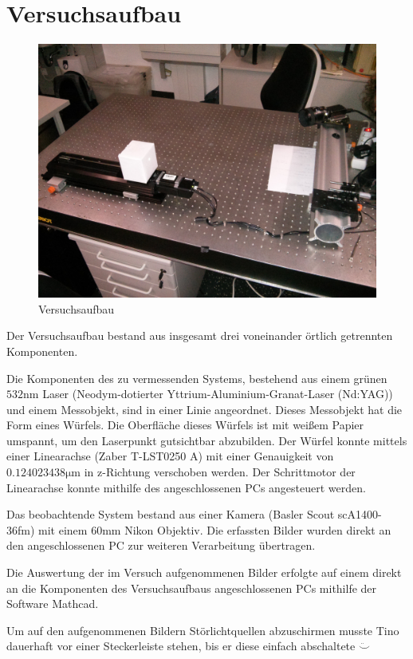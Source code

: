 \section{Versuchsaufbau}

\begin{figure}[h!]
	\centering
	\includegraphics[width=0.8\linewidth]{img/versuchsaufbaufoto.jpg}
	\caption{Versuchsaufbau}
	\label{fig:Versuchsaufbau}
\end{figure}

Der Versuchsaufbau bestand aus insgesamt drei voneinander örtlich getrennten Komponenten. 

Die Komponenten des zu vermessenden Systems, bestehend aus einem grünen $532 \si{\nano\meter}$ Laser (Neodym-dotierter Yttrium-Aluminium-Granat-Laser (Nd:YAG)) und einem Messobjekt, sind in einer Linie angeordnet. Dieses Messobjekt hat die Form eines Würfels. Die Oberfläche dieses Würfels ist mit weißem Papier umspannt, um den Laserpunkt gutsichtbar abzubilden. Der Würfel konnte mittels einer Linearachse (Zaber T-LST0250 A) mit einer Genauigkeit von $0.124023438 \si{\micro\meter}$ in z-Richtung verschoben werden. Der Schrittmotor der Linearachse konnte mithilfe des angeschlossenen PCs angesteuert werden.

Das beobachtende System bestand aus einer Kamera (Basler Scout scA1400-36fm) mit einem $60 \si{\milli\meter}$ Nikon Objektiv. Die erfassten Bilder wurden direkt an den angeschlossenen PC zur weiteren Verarbeitung übertragen.

Die Auswertung der im Versuch aufgenommenen Bilder erfolgte auf einem direkt an die Komponenten des Versuchsaufbaus angeschlossenen PCs mithilfe der Software Mathcad.

Um auf den aufgenommenen Bildern Störlichtquellen abzuschirmen musste Tino dauerhaft vor einer Steckerleiste stehen, bis er diese einfach abschaltete $\ddot\smile$